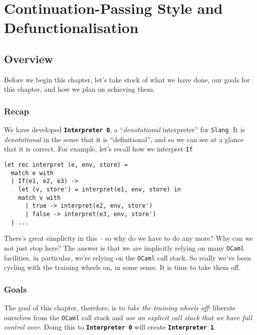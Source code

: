 \chapter{Continuation-Passing Style and Defunctionalisation}\label{chapter:cps}



\section{Overview}
Before we begin this chapter, let's take stock of what we have done, our goals for this chapter, and how we plan on achieving them. 

\subsection{Recap}
We have developed \textbf{\texttt{Interpreter 0}}, a ``\emph{denotational} interpreter'' for \texttt{Slang}. It is \emph{denotational} in the sense that it is ``definitional'', and so we can see at a glance that it is correct. For example, let's recall how we interpret \texttt{If}

\begin{code}
\begin{verbatim}
let rec interpret (e, env, store) =
  match e with
  | If(e1, e2, e3) -> 
    let (v, store') = interpret(e1, env, store) in
    match v with 
      | true -> interpret(e2, env, store')
      | false -> interpret(e3, env, store')
  | ...
\end{verbatim}
\end{code}

There's great simplicity in this -- so why do we have to do any more? Why can we not just stop here? The answer is that we are implicitly relying on many \texttt{OCaml} facilities, in particular, we're relying on the \texttt{OCaml} call stack. So really we've been cycling with the training wheels on, in some sense. It is time to take them off. 

\subsection{Goals}
The goal of this chapter, therefore, is to \emph{take the training wheels off}: liberate ourselves from the \texttt{OCaml} call stack and \emph{use an explicit call stack that we have full control over}. Doing this to \textbf{\texttt{Interpreter 0}} will create \textbf{\texttt{Interpreter 1}}.


